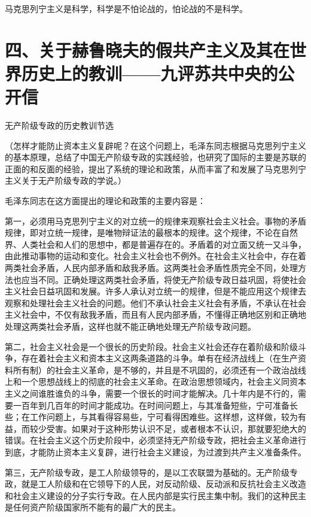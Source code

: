 马克思列宁主义是科学，科学是不怕论战的，怕论战的不是科学。

\date{一九六四年七月十四日}
\section{四、关于赫鲁晓夫的假共产主义及其在世界历史上的教训——九评苏共中央的公开信}

无产阶级专政的历史教训节选

（怎样才能防止资本主义复辟呢？在这个问题上，毛泽东同志根据马克思列宁主义的基本原理，总结了中国无产阶级专政的实践经验，也研究了国际的主要是苏联的正面的和反面的经验，提出了系统的理论和政策，从而丰富了和发展了马克思列宁主义关于无产阶级专政的学说。）

毛泽东同志在这方面提出的理论和政策的主要内容是：

第一，必须用马克思列宁主义的对立统一的规律来观察社会主义社会。事物的矛盾规律，即对立统一规律，是唯物辩证法的最根本的规律。这个规律，不论在自然界、人类社会和人们的思想中，都是普遍存在的。矛盾着的对立面又统一又斗争，由此推动事物的运动和变化。社会主义社会也不例外。在社会主义社会中，存在着两类社会矛盾，人民内部矛盾和敌我矛盾。这两类社会矛盾性质完全不同，处理方法也应当不同。正确处理这两类社会矛盾，将使无产阶级专政日益巩固，将使社会主义社会日益巩固和发展。许多人承认对立统一的规律，但是不能应用这个规律去观察和处理社会主义社会的问题。他们不承认社会主义社会有矛盾，不承认在社会主义社会中，不仅有敌我矛盾，而且有人民内部矛盾，不懂得正确地区别和正确地处理这两类社会矛盾，这样也就不能正确地处理无产阶级专政问题。

第二，社会主义社会是一个很长的历史阶段。社会主义社会还存在着阶级和阶级斗争，存在着社会主义和资本主义这两条道路的斗争。单有在经济战线上（在生产资料所有制）的社会主义革命，是不够的，并且是不巩固的，必须还有一个政治战线上和一个思想战线上的彻底的社会主义革命。在政治思想领域内，社会主义同资本主义之间谁胜谁负的斗争，需要一个很长的时间才能解决。几十年内是不行的，需要一百年到几百年的时间才能成功。在时间问题上，与其准备短些，宁可准备长些；在工作问题上，与其看得容易些，宁可看得困难些。这样想，这样做，较为有益，而较少受害。如果对于这种形势认识不足，或者根本不认识，那就要犯绝大的错误。在社会主义这个历史阶段中，必须坚持无产阶级专政，把社会主义革命进行到底，才能防止资本主义复辟，进行社会主义建设，为过渡到共产主义准备条件。

第三，无产阶级专政，是工人阶级领导的，是以工农联盟为基础的。无产阶级专政，就是工人阶级和在它领导下的人民，对反动阶级、反动派和反抗社会主义改造和社会主义建设的分子实行专政。在人民内部是实行民主集中制。我们的这种民主是任何资产阶级国家所不能有的最广大的民主。

